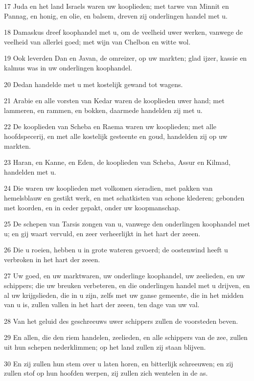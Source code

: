 \par 17 Juda en het land Israels waren uw kooplieden; met tarwe van Minnit en Pannag, en honig, en olie, en balsem, dreven zij onderlingen handel met u.
\par 18 Damaskus dreef koophandel met u, om de veelheid uwer werken, vanwege de veelheid van allerlei goed; met wijn van Chelbon en witte wol.
\par 19 Ook leverden Dan en Javan, de omreizer, op uw markten; glad ijzer, kassie en kalmus was in uw onderlingen koophandel.
\par 20 Dedan handelde met u met kostelijk gewand tot wagens.
\par 21 Arabie en alle vorsten van Kedar waren de kooplieden uwer hand; met lammeren, en rammen, en bokken, daarmede handelden zij met u.
\par 22 De kooplieden van Scheba en Raema waren uw kooplieden; met alle hoofdspecerij, en met alle kostelijk gesteente en goud, handelden zij op uw markten.
\par 23 Haran, en Kanne, en Eden, de kooplieden van Scheba, Assur en Kilmad, handelden met u.
\par 24 Die waren uw kooplieden met volkomen sieradien, met pakken van hemelsblauw en gestikt werk, en met schatkisten van schone klederen; gebonden met koorden, en in ceder gepakt, onder uw koopmanschap.
\par 25 De schepen van Tarsis zongen van u, vanwege den onderlingen koophandel met u; en gij waart vervuld, en zeer verheerlijkt in het hart der zeeen.
\par 26 Die u roeien, hebben u in grote wateren gevoerd; de oostenwind heeft u verbroken in het hart der zeeen.
\par 27 Uw goed, en uw marktwaren, uw onderlinge koophandel, uw zeelieden, en uw schippers; die uw breuken verbeteren, en die onderlingen handel met u drijven, en al uw krijgslieden, die in u zijn, zelfs met uw ganse gemeente, die in het midden van u is, zullen vallen in het hart der zeeen, ten dage van uw val.
\par 28 Van het geluid des geschreeuws uwer schippers zullen de voorsteden beven.
\par 29 En allen, die den riem handelen, zeelieden, en alle schippers van de zee, zullen uit hun schepen nederklimmen; op het land zullen zij staan blijven.
\par 30 En zij zullen hun stem over u laten horen, en bitterlijk schreeuwen; en zij zullen stof op hun hoofden werpen, zij zullen zich wentelen in de as.
